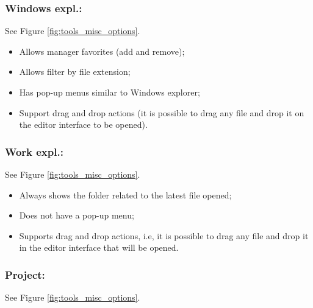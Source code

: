 \hypertarget{working_tools_misc_windowsexpl}{}
\subsubsection{Windows expl.:}

See Figure \ref{fig:tools_misc_options}.

\begin{itemize}
  \item Allows manager favorites (add and remove);
  \item Allows filter by file extension;
  \item Has pop-up menus similar to Windows explorer;
  \item Support drag and drop actions (it is possible to drag
    any file and drop it on the editor interface to be opened).
\end{itemize}


\hypertarget{working_tools_misc_workexpl}{}
\subsubsection{Work expl.:}

See Figure \ref{fig:tools_misc_options}.

\begin{itemize}
  \item Always shows the folder related to the latest file opened;
  \item Does not have a pop-up menu;
  \item Supports drag and drop actions, i.e, it is possible to drag any
    file and drop it in the editor interface that will be opened.
\end{itemize}


\hypertarget{working_tools_misc_project}{}
\subsubsection{Project:}

See Figure \ref{fig:tools_misc_options}.

